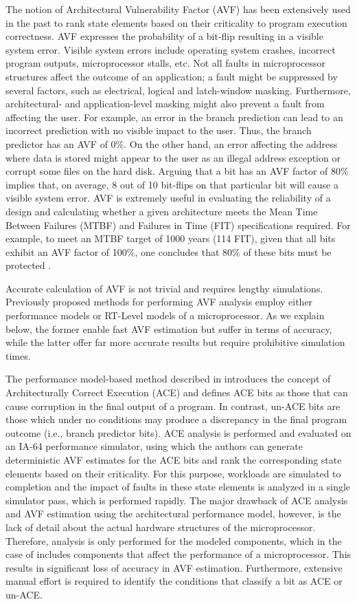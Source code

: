 \documentclass[12pt]{yalephd}
\begin{document}
The notion of Architectural Vulnerability Factor (AVF) has been extensively used in the past to rank state elements based on their criticality to program execution correctness. AVF expresses the probability of a bit-flip resulting in a visible system error. Visible system errors include operating system crashes, incorrect program outputs, microprocessor stalls, etc. Not all faults in microprocessor structures affect the outcome of an application; a fault might be suppressed by several factors, such as electrical, logical and latch-window masking. Furthermore, architectural- and application-level masking might also prevent a fault from affecting the user. For example, an error in the branch prediction can lead to an incorrect prediction with no visible impact to the user. Thus, the branch predictor has an AVF of 0\%. On the other hand, an error affecting the address where data is stored might appear to the user as an illegal address exception or corrupt some files on the hard disk. Arguing that a bit has an AVF factor of 80\% implies that, on average, 8 out of 10 bit-flips on that particular bit will cause a visible system error. AVF is extremely useful in evaluating the reliability of a design and calculating whether a given architecture meets the Mean Time Between Failures (MTBF) and Failures in Time (FIT) specifications required. For example, to meet an MTBF target of 1000 years (114 FIT), given that all bits exhibit an AVF factor of 100\%, one concludes that 80\% of these bits must be protected \cite{MWERA03}.

Accurate calculation of AVF is not trivial and requires lengthy simulations. Previously proposed methods for performing AVF analysis employ either performance models \cite{MWERA03} or RT-Level models \cite{WMP07,CzSi90,KiSo02} of a microprocessor. As we explain below, the former enable fast AVF estimation but suffer in terms of accuracy, while the latter offer far more accurate results but require prohibitive simulation times.

The performance model-based method described in \cite{MWERA03} introduces the concept of Architecturally Correct Execution (ACE) and defines ACE bits as those that can cause corruption in the final output of a program. In contrast, un-ACE bits are those which under no conditions may produce a discrepancy in the final program outcome (i.e., branch predictor bits). ACE analysis is performed and evaluated on an IA-64 performance simulator, using which the authors can generate deterministic AVF estimates for the ACE bits and rank the corresponding state elements based on their criticality. For this purpose, workloads are simulated to completion and the impact of faults in these state elements is analyzed in a single simulator pass, which is performed rapidly. The major drawback of ACE analysis and AVF estimation using the architectural performance model, however, is the lack of detail about the actual hardware structures of the microprocessor. Therefore, analysis is only performed for the modeled components, which in the case of \cite{MWERA03} includes components that affect the performance of a microprocessor. This results in significant loss of accuracy in AVF estimation. Furthermore, extensive manual effort is required to identify the conditions that classify a bit as ACE or un-ACE.
\end{document}
